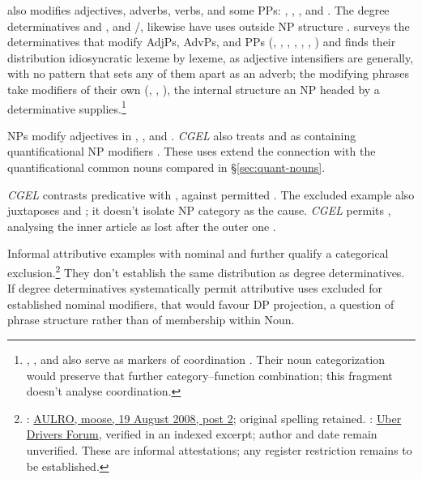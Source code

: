 \documentclass[12pt]{article}
\begin{document}
 also modifies adjectives, adverbs, verbs, and some PPs: , , , and  \citep[396--397]{huddleston2002}. The degree determinatives  and , and /, likewise have uses outside NP structure \citep[390, 395--397]{huddleston2002}. \textcite{reynolds2024why} surveys the determinatives that modify AdjPs, AdvPs, and PPs (, , , , , , ) and finds their distribution idiosyncratic lexeme by lexeme, as adjective intensifiers are generally, with no pattern that sets any of them apart as an adverb; the modifying phrases take modifiers of their own (, , ), the internal structure an NP headed by a determinative supplies.\footnote{, , and  also serve as markers of coordination \citep[1305, 1308]{huddleston2002}. Their noun categorization would preserve that further category--function combination; this fragment doesn't analyse coordination.}

NPs modify adjectives in , , and . \textit{CGEL} also treats  and  as containing quantificational NP modifiers \citep[549--550]{huddleston2002}. These uses extend the connection with the quantificational common nouns compared in §\ref{sec:quant-nouns}.

\textit{CGEL} contrasts predicative  with , against permitted  \citep[551--552]{huddleston2002}. The excluded example also juxtaposes  and ; it doesn't isolate NP category as the cause. \textit{CGEL} permits , analysing the inner article as lost after the outer one \citep[p.~552, n.~8]{huddleston2002}.

Informal attributive examples with nominal  and  further qualify a categorical exclusion.\footnote{: \href{https://www.aulro.com/afvb/motor-cycling/61858-my-track-day-phillip-island-motogp-track-post798794.html}{AULRO, moose, 19 August 2008, post 2}; original spelling retained. : \href{https://www.uberpeople.net/threads/let-s-play-would-you-have-taken-this-trip.395130/}{Uber Drivers Forum}, verified in an indexed excerpt; author and date remain unverified. These are informal attestations; any register restriction remains to be established.} They don't establish the same distribution as degree determinatives. If degree determinatives systematically permit attributive uses excluded for established nominal modifiers, that would favour DP projection, a question of phrase structure rather than of membership within Noun.
\end{document}
